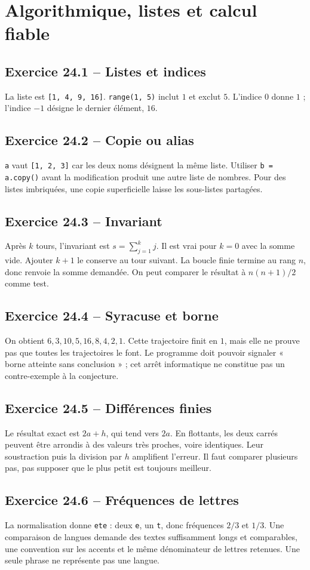 \chapter{Algorithmique, listes et calcul fiable}
\section*{Exercice 24.1 -- Listes et indices}
La liste est \texttt{[1, 4, 9, 16]}. \texttt{range(1, 5)} inclut $1$ et exclut $5$. L'indice $0$ donne $1$ ; l'indice $-1$ désigne le dernier élément, $16$.

\section*{Exercice 24.2 -- Copie ou alias}
\texttt{a} vaut \texttt{[1, 2, 3]} car les deux noms désignent la même liste. Utiliser \texttt{b = a.copy()} avant la modification produit une autre liste de nombres. Pour des listes imbriquées, une copie superficielle laisse les sous-listes partagées.

\section*{Exercice 24.3 -- Invariant}
Après $k$ tours, l'invariant est $s=\sum_{j=1}^k j$. Il est vrai pour $k=0$ avec la somme vide. Ajouter $k+1$ le conserve au tour suivant. La boucle finie termine au rang $n$, donc renvoie la somme demandée. On peut comparer le résultat à $n(n+1)/2$ comme test.

\section*{Exercice 24.4 -- Syracuse et borne}
On obtient $6,3,10,5,16,8,4,2,1$. Cette trajectoire finit en $1$, mais elle ne prouve pas que toutes les trajectoires le font. Le programme doit pouvoir signaler « borne atteinte sans conclusion » ; cet arrêt informatique ne constitue pas un contre-exemple à la conjecture.

\section*{Exercice 24.5 -- Différences finies}
Le résultat exact est $2a+h$, qui tend vers $2a$. En flottants, les deux carrés peuvent être arrondis à des valeurs très proches, voire identiques. Leur soustraction puis la division par $h$ amplifient l'erreur. Il faut comparer plusieurs pas, pas supposer que le plus petit est toujours meilleur.

\section*{Exercice 24.6 -- Fréquences de lettres}
La normalisation donne \texttt{ete} : deux \texttt{e}, un \texttt{t}, donc fréquences $2/3$ et $1/3$. Une comparaison de langues demande des textes suffisamment longs et comparables, une convention sur les accents et le même dénominateur de lettres retenues. Une seule phrase ne représente pas une langue.
